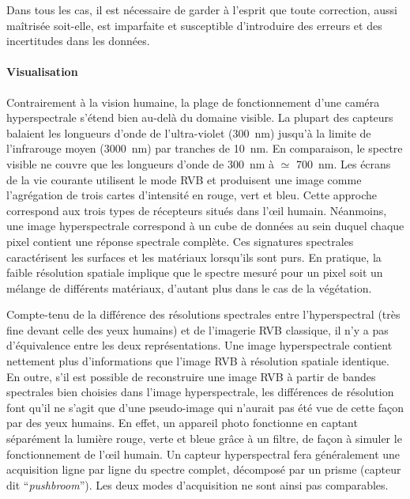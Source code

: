 Dans tous les cas, il est nécessaire de garder à l'esprit que toute correction, aussi maîtrisée soit-elle, est imparfaite et susceptible d'introduire des erreurs et des incertitudes dans les données.

\paragraph{Visualisation}
Contrairement à la vision humaine, la plage de fonctionnement d'une caméra hyperspectrale s'étend bien au-delà du domaine visible. La plupart des capteurs balaient les longueurs d'onde de l'ultra-violet (\SI{300}{\nano\meter}) jusqu'à la limite de l'infrarouge moyen (\SI{3 000}{\nano\meter}) par tranches de \SI{10}{\nano\meter}. En comparaison, le spectre visible ne couvre que les longueurs d'onde de \SI{300}{\nano\meter} à $\simeq$ \SI{700}{\nano\meter}. Les écrans de la vie courante utilisent le mode \gls{RVB} et produisent une image comme l'agrégation de trois cartes d'intensité en rouge, vert et bleu. Cette approche correspond aux trois types de récepteurs situés dans l'\oe{}il humain. Néanmoins, une image hyperspectrale correspond à un cube de données au sein duquel chaque pixel contient une réponse spectrale complète. Ces signatures spectrales caractérisent les surfaces et les matériaux lorsqu'ils sont purs. En pratique, la faible résolution spatiale implique que le spectre mesuré pour un pixel soit un mélange de différents matériaux, d'autant plus dans le cas de la végétation.

Compte-tenu de la différence des résolutions spectrales entre l'hyperspectral (très fine devant celle des yeux humains) et de l'imagerie \gls{RVB} classique, il n'y a pas d'équivalence entre les deux représentations. Une image hyperspectrale contient nettement plus d'informations que l'image \gls{RVB} à résolution spatiale identique. En outre, s'il est possible de reconstruire une image \gls{RVB} à partir de bandes spectrales bien choisies dans l'image hyperspectrale, les différences de résolution font qu'il ne s'agit que d'une pseudo-image qui n'aurait pas été vue de cette façon par des yeux humains. En effet, un appareil photo fonctionne en captant séparément la lumière rouge, verte et bleue grâce à un filtre, de façon à simuler le fonctionnement de l'\oe{}il humain. Un capteur hyperspectral fera généralement une acquisition ligne par ligne du spectre complet, décomposé par un prisme (capteur dit ``\textit{pushbroom}''). Les deux modes d'acquisition ne sont ainsi pas comparables.

